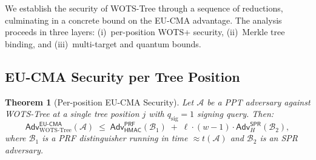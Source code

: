 \documentclass[11pt,a4paper]{article}
\newtheorem{theorem}{Theorem}[section]
\theoremstyle{definition}
\begin{document}
We establish the security of WOTS-Tree through a sequence of reductions, culminating in a concrete bound on the EU-CMA advantage. The analysis proceeds in three layers: (i)~per-position WOTS+ security, (ii)~Merkle tree binding, and (iii)~multi-target and quantum bounds.

\subsection{EU-CMA Security per Tree Position}

\begin{theorem}[Per-position EU-CMA Security]
\label{thm:eucma}
Let $\mathcal{A}$ be a PPT adversary against WOTS-Tree at a single tree position $j$ with $q_{\mathrm{sig}} = 1$ signing query. Then:
$$
\mathsf{Adv}^{\mathsf{EU\text{-}CMA}}_{\mathrm{WOTS\text{-}Tree}}(\mathcal{A})
\;\leq\;
\mathsf{Adv}^{\mathsf{PRF}}_{\mathsf{HMAC}}(\mathcal{B}_1)
\;+\;
\ell \cdot (w - 1) \cdot \mathsf{Adv}^{\mathsf{SPR}}_H(\mathcal{B}_2),
$$
where $\mathcal{B}_1$ is a PRF distinguisher running in time $\approx t(\mathcal{A})$ and $\mathcal{B}_2$ is an SPR adversary.
\end{theorem}
\end{document}
